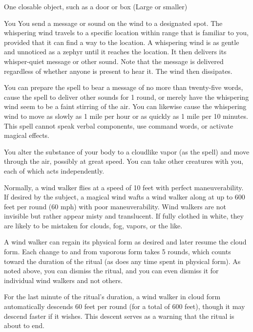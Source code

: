 \begin{spelltarget}{One closable object, such as a door or box (Large or smaller)}
\begin{spelltarget}{You}
\spelleffect You send a message or sound on the wind to a designated spot. The whispering wind travels to a specific location within range that is familiar to you, provided that it can find a way to the location. A whispering wind is as gentle and unnoticed as a zephyr until it reaches the location. It then delivers its whisper-quiet message or other sound. Note that the message is delivered regardless of whether anyone is present to hear it. The wind then dissipates.
\par You can prepare the spell to bear a message of no more than twenty-five words, cause the spell to deliver other sounds for 1 round, or merely have the whispering wind seem to be a faint stirring of the air. You can likewise cause the whispering wind to move as slowly as 1 mile per hour or as quickly as 1 mile per 10 minutes.
\spellnotes This spell cannot speak verbal components, use command words, or activate magical effects.

\spelleffect \par You alter the substance of your body to a cloudlike vapor (as the  spell) and move through the air, possibly at great speed. You can take other creatures with you, each of which acts independently.
\par Normally, a wind walker flies at a speed of 10 feet with perfect maneuverability. If desired by the subject, a magical wind wafts a wind walker along at up to 600 feet per round (60 mph) with poor maneuverability. Wind walkers are not invisible but rather appear misty and translucent. If fully clothed in white, they are likely to be mistaken for clouds, fog, vapors, or the like.
\par A wind walker can regain its physical form as desired and later resume the cloud form. Each change to and from vaporous form takes 5 rounds, which counts toward the duration of the ritual (as does any time spent in physical form). As noted above, you can dismiss the ritual, and you can even dismiss it for individual wind walkers and not others.
\par For the last minute of the ritual's duration, a wind walker in cloud form automatically descends 60 feet per round (for a total of 600 feet), though it may descend faster if it wishes. This descent serves as a warning that the ritual is about to end.


\end{spelltarget}
\end{spelltarget}
